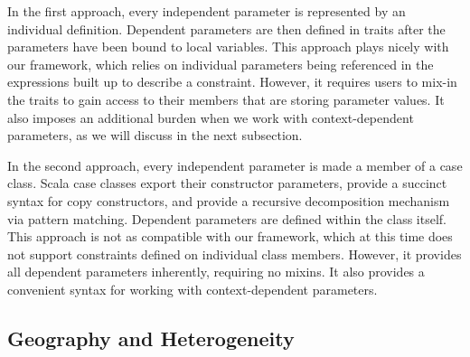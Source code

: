 In the first approach, every independent parameter is represented by an individual  definition.
Dependent parameters are then defined in traits after the parameters have been bound to local variables.
This approach plays nicely with our  framework,
which relies on individual parameters being referenced in the expressions built up to describe a constraint.
However, it requires users to mix-in the traits to gain access to their members that are storing parameter values.
It also imposes an additional burden when we work with context-dependent parameters, as we will discuss
in the next subsection.

In the second approach, every independent parameter is made a member of a case class.
Scala case classes export their constructor parameters,
provide a succinct syntax for copy constructors,
and provide a recursive decomposition mechanism via pattern matching.
Dependent parameters are defined within the class itself.
This approach is not as compatible with our  framework, which at this time
does not support constraints defined on individual class members.
However, it provides all dependent parameters inherently, requiring no mixins.
It also provides a convenient syntax for working with context-dependent parameters.

\subsection{Geography and Heterogeneity}

